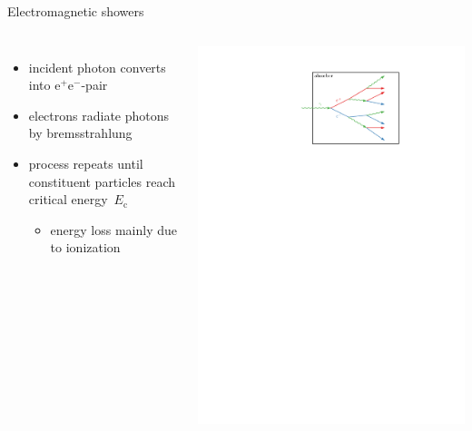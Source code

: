 \documentclass[11pt,xcolor=dvipsnames,professionalfonts]{beamer}
\begin{document}
\begin{frame}{Electromagnetic showers}
	\begin{columns}
		\begin{itemize}
			\setlength\itemsep{1.5em}
			\item incident photon converts into $\mathrm{e}^+\mathrm{e}^-$-pair
			
			\item electrons radiate photons by bremsstrahlung
			
			\item process repeats until constituent particles reach critical energy~$E_\mathrm{c}$
			\begin{itemize}
				\item energy loss mainly due to ionization
			\end{itemize}
						
		\end{itemize}
		
			\begin{center}
				\includegraphics[width=1.0\textwidth]{./figures/shower_intro.pdf}
			\end{center}
	\end{columns}
\end{frame}
\end{document}
